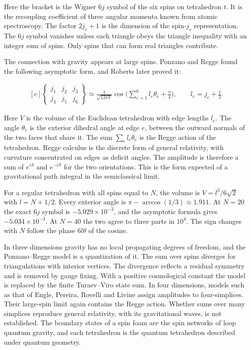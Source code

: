 \documentclass[11pt,oneside]{book}
\newenvironment{centeredalign}{\[\begin{gathered}[c]}{\end{gathered}\]}
\begin{document}
Here the bracket is the Wigner \(6j\) symbol of the six spins on tetrahedron \(t\). It is the recoupling coefficient of three angular momenta known from atomic spectroscopy. The factor \(2j_e+1\) is the dimension of the spin-\(j_e\) representation. The \(6j\) symbol vanishes unless each triangle obeys the triangle inequality with an integer sum of spins. Only spins that can form real triangles contribute.

The connection with gravity appears at large spins. Ponzano and Regge found the following asymptotic form, and Roberts later proved it:

\begin{centeredalign}
\begin{Bmatrix}j_1&j_2&j_3\\ j_4&j_5&j_6\end{Bmatrix}\simeq
\frac{1}{\sqrt{12\pi V}}\cos\Big(\sum_{e=1}^6 l_e\theta_e+\frac\pi4\Big),\qquad l_e=j_e+\tfrac12.
\end{centeredalign}

Here \(V\) is the volume of the Euclidean tetrahedron with edge lengths \(l_e\). The angle \(\theta_e\) is the exterior dihedral angle at edge \(e\), between the outward normals of the two faces that share it. The sum \(\sum_el_e\theta_e\) is the Regge action of the tetrahedron. Regge calculus is the discrete form of general relativity, with curvature concentrated on edges as deficit angles. The amplitude is therefore a sum of \(e^{iS}\) and \(e^{-iS}\) for the two orientations. This is the form expected of a gravitational path integral in the semiclassical limit.

For a regular tetrahedron with all spins equal to \(N\), the volume is \(V=l^3/6\sqrt2\) with \(l=N+1/2\). Every exterior angle is \(\pi-\arccos(1/3)\approx1.911\). At \(N=20\) the exact \(6j\) symbol is \(-5.029\times10^{-3}\), and the asymptotic formula gives \(-5.034\times10^{-3}\). At \(N=40\) the two agree to three parts in \(10^4\). The sign changes with \(N\) follow the phase \(6l\theta\) of the cosine.

In three dimensions gravity has no local propagating degrees of freedom, and the Ponzano--Regge model is a quantization of it. The sum over spins diverges for triangulations with interior vertices. The divergence reflects a residual symmetry and is removed by gauge fixing. With a positive cosmological constant the model is replaced by the finite Turaev--Viro state sum. In four dimensions, models such as that of Engle, Pereira, Rovelli and Livine assign amplitudes to four-simplices. Their large-spin limit again contains the Regge action. Whether sums over many simplices reproduce general relativity, with its gravitational waves, is not established. The boundary states of a spin foam are the spin networks of loop quantum gravity, and each tetrahedron is the quantum tetrahedron described under quantum geometry.
\end{document}
